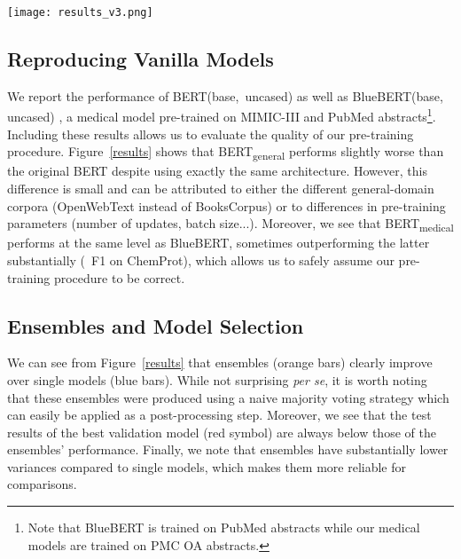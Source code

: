 \documentclass[11pt]{article}
\begin{document}
\begin{figure*}[htbp]
\begin{center} 
\texttt{[image: results\_v3.png]}
\end{center}
\caption{Comparison of pre-trained models when fine-tuned on several medical tasks. For each model, the test performance of 10 random seeds is expressed as \textit{mean}  \textit{std} and is shown in blue for single models and orange for ensembles. The performance of the best validation seed is shown in red.} \label{results}
\end{figure*}

\subsection{Reproducing Vanilla Models}

We report the performance of BERT(base,~uncased) as well as BlueBERT(base, uncased) \cite{peng2019transfer}, a medical model pre-trained on MIMIC-III and PubMed abstracts\footnote{Note that BlueBERT is trained on PubMed abstracts while our medical models are trained on PMC OA abstracts.}. Including these results allows us to evaluate the quality of our pre-training procedure. Figure~\ref{results} shows that BERT\textsubscript{general} performs slightly worse than the original BERT despite using exactly the same architecture. However, this difference is small and can be attributed to either the different general-domain corpora (OpenWebText instead of BooksCorpus) or to differences in pre-training parameters (number of updates, batch size...). Moreover, we see that BERT\textsubscript{medical} performs at the same level as BlueBERT, sometimes outperforming the latter substantially (~F1 on ChemProt), which allows us to safely assume our pre-training procedure to be correct.

\subsection{Ensembles and Model Selection}

We can see from Figure~\ref{results} that ensembles (orange bars) clearly improve over single models (blue bars). While not surprising \textit{per se}, it is worth noting that these ensembles were produced using a naive majority voting strategy which can easily be applied as a post-processing step. Moreover, we see that the test results of the best validation model (red symbol) are always below those of the ensembles' performance. Finally, we note that ensembles have substantially lower variances compared to single models, which makes them more reliable for comparisons.
\end{document}
